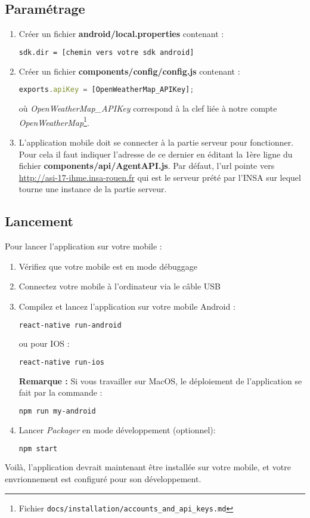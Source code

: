 \subsection{Paramétrage}

\begin{enumerate}
  \item Créer un fichier \textbf{android/local.properties} contenant :
  \begin{lstlisting}[language=bash]
  sdk.dir = [chemin vers votre sdk android]
  \end{lstlisting}
  \item Créer un fichier \textbf{components/config/config.js} contenant :
  \begin{lstlisting}[language=Javascript]
  exports.apiKey = [OpenWeatherMap_APIKey];
  \end{lstlisting}

  où \og \emph{OpenWeatherMap\_APIKey} \fg{} correspond à la clef liée à notre compte \emph{OpenWeatherMap}\footnote{Fichier \texttt{docs/installation/accounts\_and\_api\_keys.md}}.

  \item L'application mobile doit se connecter à la partie serveur pour fonctionner. Pour cela il faut indiquer l'adresse de ce dernier en
  éditant la 1ère ligne du fichier \textbf{components/api/AgentAPI.js}. Par défaut, l'url pointe vers \url{http://asi-17-ihme.insa-rouen.fr} qui est le serveur prété par l'INSA sur lequel tourne une instance de la partie serveur.
\end{enumerate}

\subsection{Lancement}

Pour lancer l'application sur votre mobile :
\begin{enumerate}
  \item Vérifiez que votre mobile est en mode débuggage
  \item Connectez votre mobile à l'ordinateur via le câble USB
  \item Compilez et lancez l'application sur votre mobile Android :
  \begin{lstlisting}[language=bash]
    react-native run-android
  \end{lstlisting}
  ou pour IOS :
  \begin{lstlisting}[language=bash]
    react-native run-ios
  \end{lstlisting}

  \textbf{Remarque : } Si vous travailler sur MacOS, le déploiement de l'application se fait par la commande :
  \begin{lstlisting}[language=bash]
    npm run my-android
  \end{lstlisting}

  \item Lancer \emph{Packager} en mode développement (optionnel):
  \begin{lstlisting}[language=bash]
    npm start
  \end{lstlisting}
\end{enumerate}

Voilà, l'application devrait maintenant être installée sur votre mobile, et votre envrionnement est configuré pour son développement.
